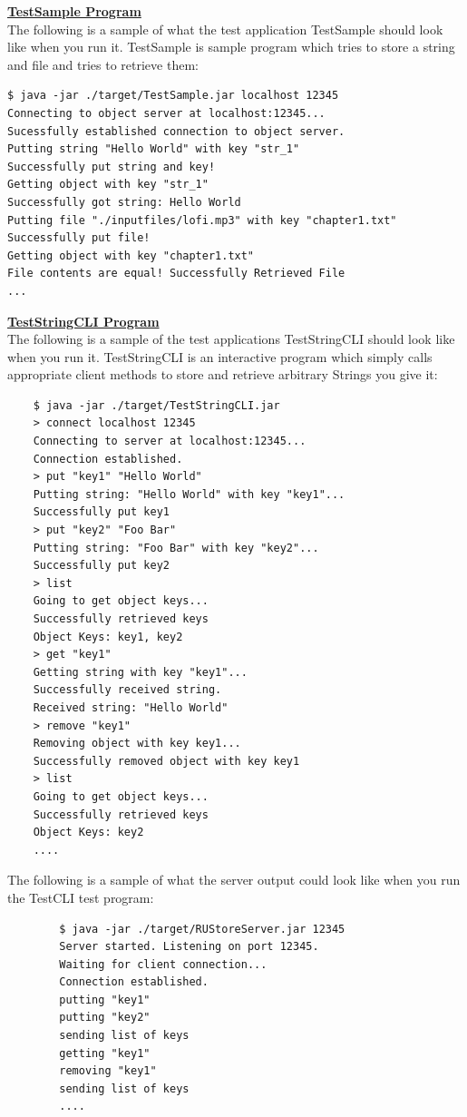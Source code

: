 \documentclass{article}
\begin{document}
\noindent \textbf{\underline{TestSample Program}} \vspace{0.2cm} \\
The following is a sample of what the test application TestSample should look like when you run it. TestSample is sample program which tries to store a string and file and tries to retrieve them:
\begin{commandline}
    \begin{verbatim}
$ java -jar ./target/TestSample.jar localhost 12345
Connecting to object server at localhost:12345...
Sucessfully established connection to object server.
Putting string "Hello World" with key "str_1"
Successfully put string and key!
Getting object with key "str_1"
Successfully got string: Hello World
Putting file "./inputfiles/lofi.mp3" with key "chapter1.txt"
Successfully put file!
Getting object with key "chapter1.txt"
File contents are equal! Successfully Retrieved File
...
    \end{verbatim}
\end{commandline}

\noindent \textbf{\underline{TestStringCLI Program}} \vspace{0.2cm} \\
The following is a sample of the test applications TestStringCLI should look like when you run it. TestStringCLI is an interactive program which simply calls appropriate client methods to store and retrieve arbitrary Strings you give it:
\begin{commandline}
	\begin{verbatim}
	$ java -jar ./target/TestStringCLI.jar
	> connect localhost 12345
	Connecting to server at localhost:12345...
	Connection established.
	> put "key1" "Hello World"
	Putting string: "Hello World" with key "key1"...
	Successfully put key1
	> put "key2" "Foo Bar"
	Putting string: "Foo Bar" with key "key2"...
	Successfully put key2
	> list
	Going to get object keys...
	Successfully retrieved keys
	Object Keys: key1, key2
	> get "key1"
	Getting string with key "key1"...
	Successfully received string.
	Received string: "Hello World"
	> remove "key1"
	Removing object with key key1...
	Successfully removed object with key key1
	> list
	Going to get object keys...
	Successfully retrieved keys
	Object Keys: key2
	....
	\end{verbatim}
\end{commandline}

\newpage
\noindent The following is a sample of what the server output could look like when you run the TestCLI test program:
\begin{commandline}
	\begin{verbatim}
		$ java -jar ./target/RUStoreServer.jar 12345
		Server started. Listening on port 12345.
		Waiting for client connection...
		Connection established.
		putting "key1"
		putting "key2"
		sending list of keys
		getting "key1"
		removing "key1"
		sending list of keys
		....
	\end{verbatim}
\end{commandline}
\end{document}
